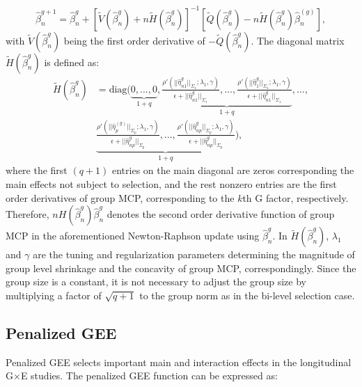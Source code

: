 \documentclass[12pt]{article}
\begin{document}
\begin{equation*}
\hat{\beta}_{n}^{g+1}=\hat{\beta}_{n}^{g}+[\tilde{V}(\hat{\beta}_{n}^{g})+n\tilde{H}(\hat{\beta}_{n}^{g})]^{-1}[\tilde{Q}(\hat{\beta}_{n}^{g})-n\tilde{H}(\hat{\beta}_{n}^{g})\hat{\beta}_{n}^{(g)}],
\end{equation*}
with $\tilde{V}(\hat{\beta}_{n}^{g})$ being the first order derivative of  $-\tilde{Q}(\hat{\beta}_{n}^{g})$.
The diagonal matrix $\tilde{H}(\hat{\beta}_{n}^{g})$ is defined as:
\begin{equation*}
\begin{aligned}
\tilde{H}(\hat{\beta}_{n}^{g})&=\text{diag}(\underbrace{0,...,0}_{1+q},\underbrace{\frac{\rho'(||\hat{\eta}_{n1}^{g}||_{\Sigma_{1}};\lambda_{1},\gamma)}{\epsilon+||\hat{\eta}_{n1}^{g}||_{\Sigma_{1}}},...,\frac{\rho'(||\hat{\eta}_{1}^{g}||_{\Sigma_{1}};\lambda_{1},\gamma)}{\epsilon+||\hat{\eta}_{n1}^{g}||_{\Sigma_{1}}}}_{1+q},...,\\ &\underbrace{\frac{\rho'(||\hat{\eta}_{p}^{(g)}||_{\Sigma_{p}};\lambda_{1},\gamma)}{\epsilon+||\hat{\eta}_{np}^{g}||_{\Sigma_{p}}},...,\frac{\rho'(||\hat{\eta}_{np}^{g}||_{\Sigma_{p}};\lambda_{1},\gamma)}{\epsilon+||\hat{\eta}_{np}^{g}||_{\Sigma_{p}}}}_{1+q}),
\end{aligned}
\end{equation*}
where the first $(q+1)$ entries on the main diagonal are zeros corresponding the main effects not subject to selection, and the rest nonzero entries are the first order derivatives of group MCP, corresponding to the $k$th G factor, respectively. Therefore, $nH(\hat{\beta}_{n}^{g})\hat{\beta}_{n}^{g}$ denotes the second order derivative function of group MCP in the aforementioned Newton-Raphson update using $\hat{\beta}_{n}^{g}$.
In $\tilde{H}(\hat{\beta}_{n}^{g})$, $\lambda_1$ and $\gamma$ are the tuning and regularization parameters determining the magnitude of group level shrinkage and the concavity of group MCP, correspondingly. Since the group size is a constant, it is not necessary to adjust the group size by multiplying a factor of $\sqrt{q+1}$ to the group norm as in the bi-level selection case.



\subsection{Penalized GEE}

Penalized GEE selects important main and interaction effects in the longitudinal G$\times$E studies. The penalized GEE function can be expressed as:
\end{document}
